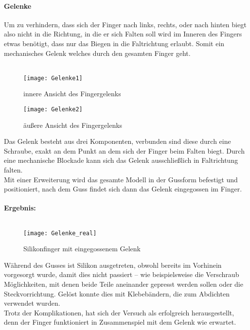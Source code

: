 \documentclass[titlepage,12pt,twoside]{article}
\begin{document}
\paragraph{Gelenke}
\hfill \break
\hfill \break
Um zu verhindern, dass sich der Finger nach links, rechts, oder nach hinten biegt also nicht in die Richtung, in die er sich Falten soll wird im Inneren des Fingers etwas benötigt, dass nur das Biegen in die Faltrichtung erlaubt. Somit ein 
mechanisches Gelenk welches durch den gesamten Finger geht. \\
\\
\begin{figure}[H]
	\begin{center}
		\scalebox{0.8}
		{\texttt{[image: Gelenke1]}}
		\caption{innere Ansicht des Fingergelenks}
		\label{fig:Gelenke1}			
	\end{center}
\end{figure}
\begin{figure}[H]
	\begin{center}
		\scalebox{0.8}
		{\texttt{[image: Gelenke2]}}
		\caption{äußere Ansicht des Fingergelenks}
		\label{fig:Gelenke2}			
	\end{center}
\end{figure}
\hfill \break
Das Gelenk besteht aus drei Komponenten, verbunden sind diese durch eine Schraube, exakt an dem Punkt an dem sich der Finger beim Falten biegt. Durch eine mechanische Blockade kann sich das Gelenk ausschließlich in Faltrichtung falten. \\
Mit einer Erweiterung wird das gesamte Modell in der Gussform befestigt und positioniert, nach dem Guss findet sich dann das Gelenk eingegossen im Finger. \\
\\
\textbf{Ergebnis:} \\
\\
\begin{figure}[H]
	\begin{center}
		\scalebox{0.8}
		{\texttt{[image: Gelenke\_real]}}
		\caption{Silikonfinger mit eingegossenem Gelenk}
		\label{fig:Gelenke_real}			
	\end{center}
\end{figure}
\hfill \break
Während des Gusses ist Silikon ausgetreten, obwohl bereits im Vorhinein vorgesorgt wurde, damit dies nicht passiert – wie beispielsweise die Verschraub Möglichkeiten, mit denen beide Teile aneinander gepresst werden sollen oder die Steckvorrichtung. 
Gelöst konnte dies mit Klebebändern, die zum Abdichten verwendet wurden. \\
Trotz der Komplikationen, hat sich der Versuch als erfolgreich herausgestellt, denn der Finger funktioniert in Zusammenspiel mit dem Gelenk wie erwartet. \\
\end{document}
